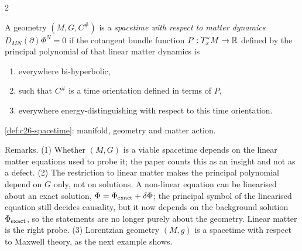 \begin{paracol}{2}
\begin{definition}\label{def:c29-spacetime}
A geometry $(M,G,C^\#)$ is a \emph{spacetime with respect to matter dynamics} $D_{MN}(\partial)\Phi^N=0$ if the cotangent bundle function $P:T^*_xM\to\mathbb{R}$ defined by the principal polynomial of that linear matter dynamics is
\begin{enumerate}
  \item everywhere bi-hyperbolic,
  \item such that $C^\#$ is a time orientation defined in terms of $P$,
  \item everywhere energy-distinguishing with respect to this time orientation.
\end{enumerate}
\end{definition}
\begin{recall}
\cref{def:c26-spacetime}: manifold, geometry and matter action.
\end{recall}

Remarks. (1) Whether $(M,G)$ is a viable spacetime depends on the linear matter equations used to probe it; the paper counts this as an insight and not as a defect. (2) The restriction to linear matter makes the principal polynomial depend on $G$ only, not on solutions. A non-linear equation can be linearised about an exact solution, $\Phi=\Phi_{\rm exact}+\delta\Phi$; the principal symbol of the linearised equation still decides causality, but it now depends on the background solution $\Phi_{\rm exact}$, so the statements are no longer purely about the geometry. Linear matter is the right probe. (3) Lorentzian geometry $(M,g)$ is a spacetime with respect to Maxwell theory, as the next example shows.


\end{paracol}
